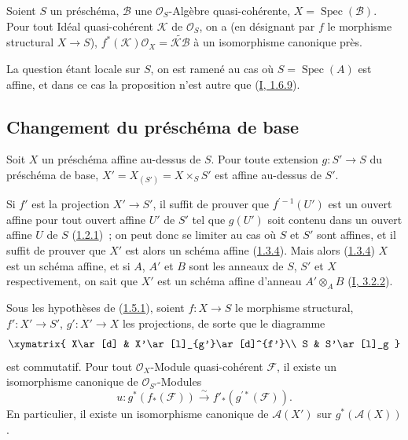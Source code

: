 \begin{proposition}[1.4.11]
\label{II.1.4.11-fr}
Soient $S$ un préschéma, $\mathcal{B}$ une $\mathcal{O}_S$-Algèbre
quasi-cohérente, $X=\operatorname{Spec}(\mathcal{B})$. Pour tout Idéal
quasi-cohérent $\mathcal{K}$ de $\mathcal{O}_S$, on a (en désignant par $f$
le morphisme structural $X\to S$),
$f^*(\mathcal{K})\mathcal{O}_X=\widetilde{\mathcal{K}\mathcal{B}}$ à un
isomorphisme canonique près.
\end{proposition}

La question étant locale sur $S$, on est ramené au cas où
$S=\operatorname{Spec}(A)$ est affine, et dans ce cas la proposition n'est
autre que (\hyperref[I.1.6.9-fr]{I, 1.6.9}).

\subsection{Changement du préschéma de base}
\label{II.1.5-fr}

\begin{proposition}[1.5.1]
\label{II.1.5.1-fr}
Soit $X$ un préschéma affine au-dessus de $S$. Pour toute extension
$g:S'\to S$ du préschéma de base, $X'=X_{(S')}=X\times_S S'$ est affine
au-dessus de $S'$.
\end{proposition}

Si $f'$ est la projection $X'\to S'$, il suffit de prouver que
$f^{\prime-1}(U')$ est un ouvert affine pour tout ouvert affine $U'$ de $S'$
tel que $g(U')$ soit contenu dans un ouvert affine $U$ de $S$
(\hyperref[II.1.2.1-fr]{1.2.1})~; on peut donc se limiter au cas où $S$ et
$S'$ sont affines, et il suffit de prouver que $X'$ est alors un schéma
affine (\hyperref[II.1.3.4-fr]{1.3.4}). Mais alors
(\hyperref[II.1.3.4-fr]{1.3.4}) $X$ est un schéma affine, et si $A$, $A'$ et
$B$ sont les anneaux de $S$, $S'$ et $X$ respectivement, on sait que $X'$ est
un schéma affine d'anneau $A'\otimes_A B$
(\hyperref[I.3.2.2-fr]{I, 3.2.2}).

\begin{corollary}[1.5.2]
\label{II.1.5.2-fr}
Sous les hypothèses de (\hyperref[II.1.5.1-fr]{1.5.1}), soient $f:X\to S$
le morphisme structural, $f':X'\to S'$, $g':X'\to X$ les projections, de
sorte que le diagramme
\[
  \xymatrix{
    X\ar[d] & X'\ar[l]_{g'}\ar[d]^{f'}\\
    S & S'\ar[l]_g
  }
\]
est commutatif. Pour tout $\mathcal{O}_X$-Module quasi-cohérent $\mathcal{F}$,
il existe un isomorphisme canonique de $\mathcal{O}_{S'}$-Modules
\[
  u:g^*(f_*(\mathcal{F}))\xrightarrow{\sim}
  f'_*(g^{\prime*}(\mathcal{F})).
  \tag{1.5.2.1}\label{II.1.5.2.1-fr}
\]
En particulier, il existe un isomorphisme canonique de $\mathcal{A}(X')$ sur
$g^*(\mathcal{A}(X))$.
\end{corollary}

